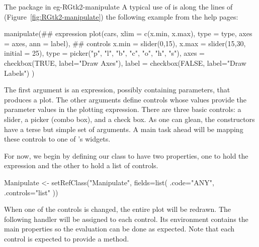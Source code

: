 \begin{example}{The  package in }{eg-RGtk2-manipulate}
A typical use of  is along the lines of
(Figure~\ref{fig:RGtk2-manipulate}) the following example from the
 help pages:
\begin{Schunk}
\begin{Sinput}
 manipulate(## expression
            plot(cars, xlim = c(x.min, x.max), type = type, 
                 axes = axes, ann = label),
            ## controls
            x.min = slider(0,15),
            x.max = slider(15,30, initial = 25),
            type = picker("p", "l", "b", "c", "o", "h", "s"),
            axes = checkbox(TRUE, label="Draw Axes"),
            label = checkbox(FALSE, label="Draw Labels")
            )
\end{Sinput}
\end{Schunk}
%
The first argument is an expression, possibly containing parameters,
that produces a plot. The other arguments define controls whose values
provide the parameter values in the plotting expression. There are
three basic controls: a slider, a picker (combo box), and a check
box. As one can glean, the constructors have a terse but simple set
of arguments. A main task ahead will be mapping these controls to one
of \GTK's widgets.

For now, we begin by defining our  class to have two
properties, one to hold the expression and the other to hold a list of controls.
\begin{Schunk}
\begin{Sinput}
 Manipulate <- setRefClass("Manipulate",
                           fields=list(
                             .code="ANY",
                             .controls="list"
                             ))
\end{Sinput}
\end{Schunk}
%



When one of the controls is changed, the entire plot will be
redrawn. The following handler will be assigned to each control. Its
environment contains the main properties so the evaluation can be done
as expected. Note that each control is expected to provide a
 method.

\begin{Schunk}
\end{Schunk}
%


\end{example}
